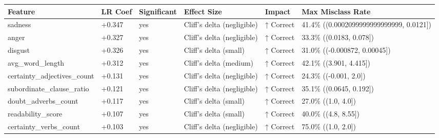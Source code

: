 \begin{tabular}{llllll}
\toprule
Feature & LR Coef & Significant & Effect Size & Impact & Max Misclass Rate \\
\midrule
sadness & +0.347 & yes & Cliff's delta (negligible) & ↑ Correct & 41.4\% ((0.0002099999999999999, 0.0121]) \\
anger & +0.327 & yes & Cliff's delta (negligible) & ↑ Correct & 33.3\% ((0.0183, 0.078]) \\
disgust & +0.326 & yes & Cliff's delta (small) & ↑ Correct & 31.0\% ((-0.000872, 0.00045]) \\
avg\_word\_length & +0.312 & yes & Cliff's delta (medium) & ↑ Correct & 42.1\% ((3.901, 4.415]) \\
certainty\_adjectives\_count & +0.131 & yes & Cliff's delta (negligible) & ↑ Correct & 24.3\% ((-0.001, 2.0]) \\
subordinate\_clause\_ratio & +0.121 & yes & Cliff's delta (negligible) & ↑ Correct & 35.1\% ((0.0645, 0.192]) \\
doubt\_adverbs\_count & +0.117 & yes & Cliff's delta (small) & ↑ Correct & 27.0\% ((1.0, 4.0]) \\
readability\_score & +0.107 & yes & Cliff's delta (small) & ↑ Correct & 40.0\% ((4.8, 8.55]) \\
certainty\_verbs\_count & +0.103 & yes & Cliff's delta (negligible) & ↑ Correct & 75.0\% ((1.0, 2.0]) \\
\bottomrule
\end{tabular}
